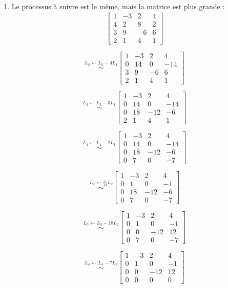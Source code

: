 \begin{exercice}
\begin{enumerate}
\item Le processus à suivre est le même, mais la matrice est plus grande :
$$  \begin{bmatrix}
    1 & -3 & 2 & 4 \\
    4 & 2 & 8 & 2 \\
    3 & 9 & -6 & 6 \\
    2 & 1 & 4 & 1
    \end{bmatrix}
$$

$$
\overset{L_2 \leftarrow L_2 - 4L_1}{\sim}
\begin{bmatrix}
    1 & -3 & 2 & 4 \\
    0 & 14 & 0 & -14 \\
    3 & 9 & -6 & 6 \\
    2 & 1 & 4 & 1
    \end{bmatrix}
$$

$$
\overset{L_3 \leftarrow L_3 - 3L_1}{\sim}
\begin{bmatrix}
    1 & -3 & 2 & 4 \\
    0 & 14 & 0 & -14 \\
    0 & 18 & -12 & -6 \\
    2 & 1 & 4 & 1
    \end{bmatrix}
$$

$$
\overset{L_4 \leftarrow L_4 - 2L_1}{\sim}
\begin{bmatrix}
    1 & -3 & 2 & 4 \\
    0 & 14 & 0 & -14 \\
    0 & 18 & -12 & -6 \\
    0 & 7 & 0 & -7
    \end{bmatrix}
$$

$$
\overset{L_2 \leftarrow \frac{1}{14}L_2}{\sim}
\begin{bmatrix}
    1 & -3 & 2 & 4 \\
    0 & 1 & 0 & -1 \\
    0 & 18 & -12 & -6 \\
    0 & 7 & 0 & -7
    \end{bmatrix}
$$  

$$
\overset{L_3 \leftarrow L_3 - 18L_2}{\sim}
\begin{bmatrix}
    1 & -3 & 2 & 4 \\
    0 & 1 & 0 & -1 \\
    0 & 0 & -12 & 12 \\
    0 & 7 & 0 & -7
    \end{bmatrix}
$$

$$
\overset{L_4 \leftarrow L_4 - 7L_2}{\sim}
\begin{bmatrix}
    1 & -3 & 2 & 4 \\
    0 & 1 & 0 & -1 \\
    0 & 0 & -12 & 12 \\
    0 & 0 & 0 & 0
    \end{bmatrix}
$$
\end{enumerate}
\end{exercice}

